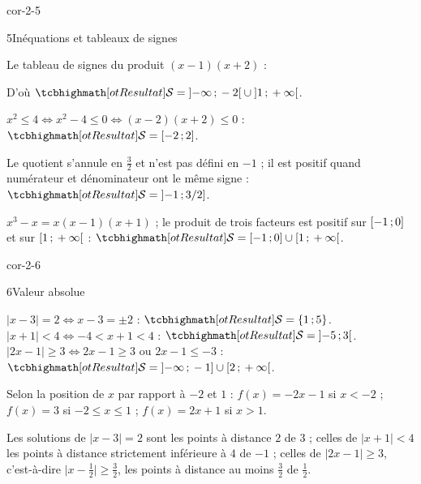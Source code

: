 \begin{blocLivre}{cor-2-5}
\begin{corrige}{5}{Inéquations et tableaux de signes}
\begin{questions}
  \item Le tableau de signes du produit $(x-1)(x+2)$ :
\begin{center}
\begin{tableau}
\end{tableau}
\end{center}
    D'où $\res{\mathcal{S}=\intOO{-\infty}{-2}\cup\intOO{1}{+\infty}}$.
  \item $x^{2}\leq4\iff x^{2}-4\leq0\iff(x-2)(x+2)\leq0$ :
    $\res{\mathcal{S}=\intFF{-2}{2}}$.
  \item Le quotient s'annule en $\frac32$ et n'est pas défini en $-1$ ; il est
    positif quand numérateur et dénominateur ont le même signe :
    $\res{\mathcal{S}=\intOF{-1}{3/2}}$.
  \item $x^{3}-x=x(x-1)(x+1)$ ; le produit de trois facteurs est positif sur
    $\mathopen{[}-1\,{;}\,0\mathclose{]}$ et sur $\mathopen{[}1\,{;}\,+\infty\mathclose{[}$ :
    $\res{\mathcal{S}=\intFF{-1}{0}\cup\intFO{1}{+\infty}}$.
\end{questions}
\end{corrige}
\end{blocLivre}

\begin{blocLivre}{cor-2-6}
\begin{corrige}{6}{Valeur absolue}
\begin{questions}
  \item $|x-3|=2\iff x-3=\pm2$ : $\res{\mathcal{S}=\ens{1\,;5}}$.\quad
    $|x+1|<4\iff-4<x+1<4$ : $\res{\mathcal{S}=\intOO{-5}{3}}$.\quad
    $|2x-1|\geq3\iff2x-1\geq3$ ou $2x-1\leq-3$ :
    $\res{\mathcal{S}=\intOF{-\infty}{-1}\cup\intFO{2}{+\infty}}$.
  \item Selon la position de $x$ par rapport à $-2$ et $1$ :
    $f(x)=-2x-1$ si $x<-2$ ;\quad $f(x)=3$ si $-2\leq x\leq1$ ;\quad
    $f(x)=2x+1$ si $x>1$.
  \item Les solutions de $|x-3|=2$ sont les points à distance $2$ de $3$ ;
    celles de $|x+1|<4$ les points à distance strictement inférieure à $4$ de
    $-1$ ; celles de $|2x-1|\geq3$, c'est-à-dire $\bigl|x-\frac12\bigr|\geq\frac32$,
    les points à distance au moins $\frac32$ de $\frac12$.
\end{questions}
\end{corrige}
\end{blocLivre}

